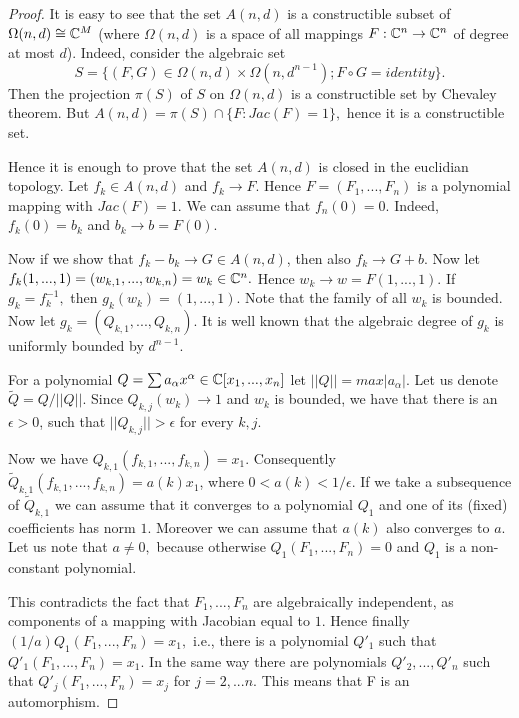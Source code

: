 \documentclass[10pt,a4paper]{amsart}
\begin{document}
\begin{proof}
It is easy to see that the set $A(n, d)$ is a constructible subset of $\Omega(n,d)\cong\Bbb C^M$ (where  $\Omega(n,d)$ is a space of all  mappings $F:\Bbb C^n \to \Bbb C^n$ of degree at most $d$).  Indeed, consider the algebraic set 
$$S=\{ (F,G)\in \Omega(n,d)\times \Omega(n, d^{n-1}) ; F\circ G=identity\}.$$ Then the projection $\pi(S)$ of
$S$ on  $\Omega(n,d)$ is a constructible set by Chevaley theorem. But $A(n,d)=\pi(S) \cap \{ F : Jac(F)=1\},$ hence it is a constructible set.



Hence it is enough to prove that the set $A(n, d)$ is closed in the euclidian topology. Let $f_k \in A(n, d)$ and $f_k \to F.$ 
Hence $F = (F_1, ..., F_n)$ is a polynomial mapping with $Jac(F ) = 1.$ We can assume that $f_n (0) = 0.$ Indeed, $f_k (0) = b_k$ and $b_k \to b = F (0).$

 Now if we show that $f_k - b_k \to G \in A(n, d)$,  then also $f_k \to G + b.$ Now let $f_k(1, ..., 1) = (w_{k,1} , ..., w_{k,n}) = w_k \in \Bbb C^n.$
  Hence $w_k \to w = F (1, ..., 1).$  If $g_k = f^{ -1}_k,$ then $g_k(w_k) = (1, ..., 1).$  Note that the family of all $w_k$ is bounded.
  Now let $g_k = (Q_{k,1} , ..., Q_{k,n}).$ It is well known that the algebraic degree of $g_k$ is uniformly bounded by $d^{n-1}.$
  
   For a polynomial $Q = \sum a_\alpha x^\alpha\in  \Bbb C[x_1, ..., x_n]$ let $||Q|| =max |a_\alpha|.$ Let us denote $\tilde{Q} = Q/||Q||.$
    Since $Q_{k,j} (w_k) \to 1$ and $w_k$ is bounded, we have that there is an $\epsilon > 0$, such that $||Q_{k,j} || > \epsilon$ for every $k, j.$
    
    Now we have $Q_{k,1} (f_{k,1} , ..., f_{k,n} ) = x_1$. Consequently $\tilde{Q}_{k,1} (f_{k,1} , ..., f_{k,n} ) = a(k) x_1$, where $0 <a(k) < 1/\epsilon$. 
    If we take a subsequence of $\tilde{Q}_{k,1}$ we can assume that it converges to a polynomial $Q_1$ and one of its (fixed) coefficients has norm $1$. 
    Moreover we can assume that $a(k)$ also converges to $a$. Let us note that $a  \not= 0,$ because otherwise $Q_1(F_1, ..., F_n) = 0$ and $Q_1$ is a non-constant polynomial. 
    
    This contradicts the fact that $F_1, ..., F_n$ are algebraically independent, as components of a mapping with Jacobian equal to $1.$
     Hence finally $(1/a)Q_1(F_1, ..., F_n) = x_1,$ i.e., there is a polynomial $Q'_1$ such that $Q'_1(F_1, ..., F_n) = x_1.$
      In the same way there are polynomials $Q'_2, ..., Q'_n$ such that $Q'_j (F_1, ..., F_n) = x_j$ for $j = 2, ...n.$ This means that F is an automorphism.
\end{proof}
\end{document}
